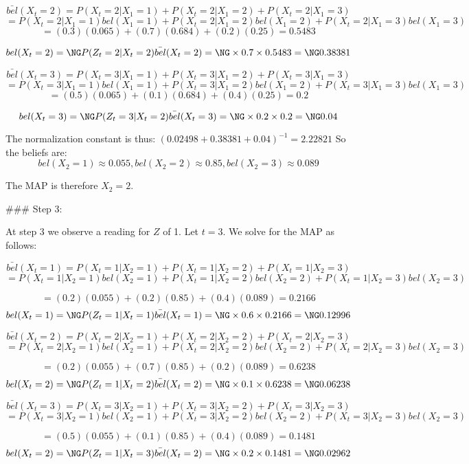 $$ \bar{bel}(X_t = 2) = P(X_t = 2 | X_1 = 1) + P(X_t = 2 | X_1 = 2) + P(X_t = 2| X_1 = 3)$$
$$ = P(X_t = 2 | X_1 = 1) bel(X_1 = 1) + P(X_t = 2 | X_1 = 2)  bel(X_1 = 2) + P(X_t = 2 | X_1 = 3)  bel(X_1 = 3)$$
$$ = (0.3)(0.065)+(0.7)(0.684) + (0.2)(0.25)  = 0.5483 $$

$$ bel(X_t = 2) = Ŋ P(Z_t = 2 | X_t = 2) \bar{bel}(X_t = 2) = Ŋ \times 0.7 \times 0.5483 = \NG 0.38381$$


$$ \bar{bel}(X_t = 3) = P(X_t = 3 | X_1 = 1) + P(X_t = 3 | X_1 = 2) + P(X_t = 3| X_1 = 3)$$
$$ = P(X_t = 3 | X_1 = 1) bel(X_1 = 1) + P(X_t = 3 | X_1 = 2)  bel(X_1 = 2) + P(X_t = 3 | X_1 = 3)  bel(X_1 = 3)$$
$$ = (0.5)(0.065)+(0.1)( 0.684)+(0.4)(0.25)  = 0.2 $$

$$ bel(X_t = 3) = Ŋ P(Z_t = 3 | X_t = 2) \bar{bel}(X_t = 3) = Ŋ \times 0.2 \times 0.2 = \NG 0.04  $$

The normalization constant is thus: $ (0.02498 + 0.38381 + 0.04)^{-1} = 2.22821 $ So the beliefs are: $$ bel(X_2 = 1) \approx 0.055, bel(X_2 = 2) \approx 0.85, bel(X_2 = 3) \approx 0.089 $$

The MAP is therefore $X_2 = 2$.

### Step 3:

At step 3 we observe a reading for $Z$ of 1. Let $t = 3$. We solve for the MAP as follows:


$$ \bar{bel}(X_t = 1) = P(X_t = 1 | X_2 = 1) + P(X_t = 1 | X_2 = 2) + P(X_t = 1 | X_2 = 3)$$
$$ = P(X_t = 1 | X_2 = 1) bel(X_2 = 1) + P(X_t = 1 | X_2 = 2)  bel(X_2 = 2) + P(X_t = 1 | X_2 = 3)  bel(X_2 = 3)$$

$$ = (0.2)(0.055)+(0.2)(0.85)+(0.4)(0.089) = 0.2166 $$
$$ bel(X_t = 1) = Ŋ P(Z_t = 1 | X_t = 1) \bar{bel}(X_t = 1) = Ŋ \times 0.6 \times 0.2166 = \NG 0.12996 $$


$$ \bar{bel}(X_t = 2) = P(X_t = 2 | X_2 = 1) + P(X_t = 2 | X_2 = 2) + P(X_t = 2 | X_2 = 3)$$
$$ = P(X_t = 2 | X_2 = 1) bel(X_2 = 1) + P(X_t = 2 | X_2 = 2)  bel(X_2 = 2) + P(X_t = 2 | X_2 = 3)  bel(X_2 = 3)$$

$$ = (0.2)(0.055)+(0.7)(0.85)+(0.2)(0.089) = 0.6238 $$
$$ bel(X_t = 2) = Ŋ P(Z_t = 1 | X_t = 2) \bar{bel}(X_t = 2) = Ŋ \times 0.1 \times 0.6238 = \NG 0.06238 $$

$$ \bar{bel}(X_t = 3) = P(X_t = 3 | X_2 = 1) + P(X_t = 3 | X_2 = 2) + P(X_t = 3 | X_2 = 3)$$
$$ = P(X_t = 3 | X_2 = 1) bel(X_2 = 1) + P(X_t = 3 | X_2 = 2)  bel(X_2 = 2) + P(X_t = 3 | X_2 = 3)  bel(X_2 = 3)$$

$$ = (0.5)(0.055)+(0.1)(0.85)+(0.4)(0.089) = 0.1481 $$
$$ bel(X_t = 2) = Ŋ P(Z_t = 1 | X_t = 3) \bar{bel}(X_t = 2) = Ŋ \times 0.2 \times 0.1481 = \NG 0.02962 $$

